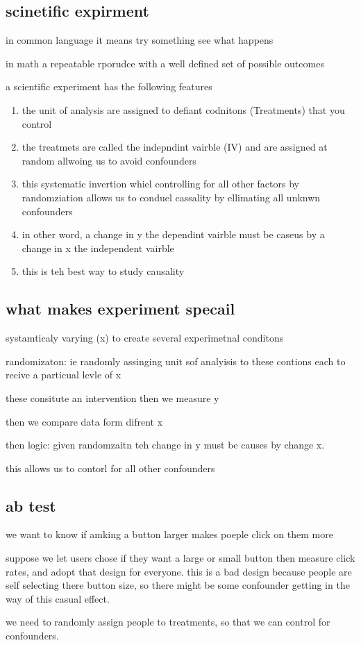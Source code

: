 \documentclass{article}
\begin{document}
\subsection{scinetific expirment}
\item in common language it means try something see what happens 
\item in math a repeatable rporudce with a well defined set of possible outcomes 
\item a scientific experiment has the following features 
\begin{enumerate}
    \item the unit of analysis are assigned to defiant codnitons (Treatments) that you control
    \item the treatmets are called the indepndint vairble (IV) and are assigned at random allwoing us to avoid confounders 
    \item this systematic invertion whiel controlling for all other factors by randomziation allows us to conduel cassality by ellimating all unknwn confounders
    \item in other word, a change in y the dependint vairble must be caseus by a change in x the independent vairble 
    \item this is teh best way to study causality
\end{enumerate}
\subsection{what makes experiment specail}
\item systamticaly varying (x) to create several experimetnal conditons 
\item randomizaton: ie randomly assinging unit sof analyisis to these contions each to recive a particual levle of x 
\item these consitute an intervention 
\iten then we measure y
\item then we compare data form difrent x 
\item then logic: given randomzaitn teh change in y must be causes by change  x.
\item this allows us to contorl for all other confounders
\subsection{ab test}
\item we want to know if amking a button larger makes poeple click on them more 
\item suppose we let users chose if they want a large or small button then measure click rates, and adopt that design for everyone. this is a bad design because people are self selecting there button size, so there might be some confounder getting in the way of this casual effect. 
\item we need to randomly assign people to treatments, so that we can control for confounders. 
\end{document}

